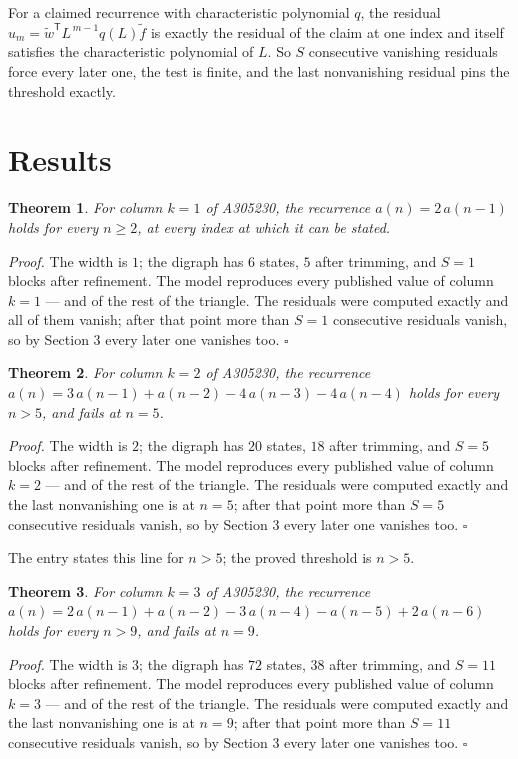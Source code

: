 \documentclass[11pt]{article}
\newtheorem{theorem}{Theorem}
\theoremstyle{definition}
\begin{document}
For a claimed recurrence with characteristic polynomial $q$, the residual $u_m = \tilde w^{\mathsf T}L^{\,m-1}q(L)\tilde f$ is exactly the residual of the claim at one index and itself satisfies the characteristic polynomial of $L$. So $S$ consecutive vanishing residuals force every later one, the test is finite, and the last nonvanishing residual pins the threshold exactly.

\section{Results}

\begin{theorem} For column $k = 1$ of A305230, the recurrence $a(n) = 2\,a(n-1)$ holds for every $n \ge 2$, at every index at which it can be stated.\end{theorem}

{\itshape Proof.} The width is $1$; the digraph has $6$ states, $5$ after trimming, and $S = 1$ blocks after refinement. The model reproduces every published value of column $k = 1$ --- and of the rest of the triangle. The residuals were computed exactly and all of them vanish; after that point more than $S = 1$ consecutive residuals vanish, so by Section 3 every later one vanishes too. $\square$

\begin{theorem} For column $k = 2$ of A305230, the recurrence $a(n) = 3\,a(n-1) + a(n-2) - 4\,a(n-3) - 4\,a(n-4)$ holds for every $n > 5$, and fails at $n = 5$.\end{theorem}

{\itshape Proof.} The width is $2$; the digraph has $20$ states, $18$ after trimming, and $S = 5$ blocks after refinement. The model reproduces every published value of column $k = 2$ --- and of the rest of the triangle. The residuals were computed exactly and the last nonvanishing one is at $n = 5$; after that point more than $S = 5$ consecutive residuals vanish, so by Section 3 every later one vanishes too. $\square$

The entry states this line for $n > 5$; the proved threshold is $n > 5$.

\begin{theorem} For column $k = 3$ of A305230, the recurrence $a(n) = 2\,a(n-1) + a(n-2) - 3\,a(n-4) - a(n-5) + 2\,a(n-6)$ holds for every $n > 9$, and fails at $n = 9$.\end{theorem}

{\itshape Proof.} The width is $3$; the digraph has $72$ states, $38$ after trimming, and $S = 11$ blocks after refinement. The model reproduces every published value of column $k = 3$ --- and of the rest of the triangle. The residuals were computed exactly and the last nonvanishing one is at $n = 9$; after that point more than $S = 11$ consecutive residuals vanish, so by Section 3 every later one vanishes too. $\square$
\end{document}
